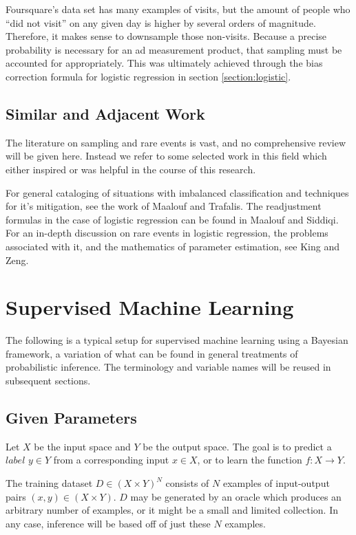 \documentclass[twoside]{article}
\begin{document}
Foursquare's data set has many examples of visits, but the amount of people who “did not visit” on any given day is higher by several orders of magnitude. Therefore, it makes sense to downsample those non-visits. Because a precise probability is necessary for an ad measurement product, that sampling must be accounted for appropriately. This was ultimately achieved through the bias correction formula for logistic regression in section \ref{section:logistic}.

\subsection{Similar and Adjacent Work}

The literature on sampling and rare events is vast, and no comprehensive review will be given here. Instead we refer to some selected work in this field which either inspired or was helpful in the course of this research.

For general cataloging of situations with imbalanced classification and techniques for it's mitigation, see the work of Maalouf and Trafalis\cite{rareevents}. The readjustment formulas in the case of logistic regression can be found in Maalouf and Siddiqi\cite{weightedlogistic}. For an in-depth discussion on rare events in logistic regression, the problems associated with it, and the mathematics of parameter estimation, see King and Zeng\cite{king}.

\section{Supervised Machine Learning} \label{framework}

The following is a typical setup for supervised machine learning using a Bayesian framework, a variation of what can be found in general treatments of probabilistic inference\cite{pythonbayes}\cite{gelmanbayes}\cite{blais}. The terminology and variable names will be reused in subsequent sections.

\subsection{Given Parameters}

Let \(X\) be the input space and \(Y\) be the output space. The goal is to predict a \(label\) \(y \in Y\) from a corresponding input \(x \in X\), or to learn the function \(f: X \to Y\).

The training dataset \(D \in (X \times Y)^N\) consists of \(N\) examples of input-output pairs \((x, y) \in (X \times Y) \). \(D\) may be generated by an oracle which produces an arbitrary number of examples, or it might be a small and limited collection. In any case, inference will be based off of just these \(N\) examples.
\end{document}
